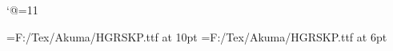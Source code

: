 \catcode`@=11\relax
%

\font\LD@Font@Kana={F:/Tex/Akuma/HGRSKP.ttf} at 10pt
\font\LD@Font@Kana@Tiny={F:/Tex/Akuma/HGRSKP.ttf} at 6pt
\LD@Font@Kana


\def\LD@Akuma@Language{fre}%



\bye
